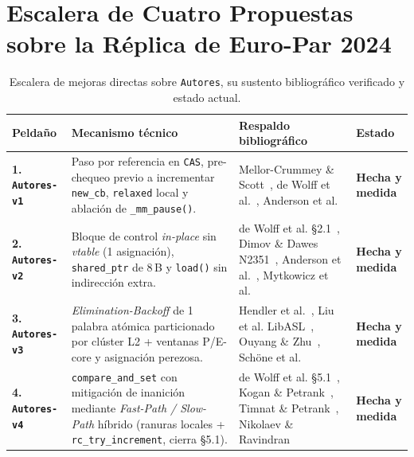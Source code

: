 \documentclass[11pt,a4paper]{article}
\begin{document}
\section{Escalera de Cuatro Propuestas sobre la Réplica de Euro-Par 2024}

\begin{table}[H]
\centering
\caption{Escalera de mejoras directas sobre \texttt{Autores}, su sustento bibliográfico verificado y estado actual.}
\label{tab:escalera}
\footnotesize
\begin{tabularx}{\linewidth}{@{}l >{\raggedright\arraybackslash}X >{\raggedright\arraybackslash}p{4.3cm} l@{}}
\toprule
\textbf{Peldaño} & \textbf{Mecanismo técnico} & \textbf{Respaldo bibliográfico} & \textbf{Estado} \\
\midrule
\textbf{1. \texttt{Autores-v1}} & Paso por referencia en \texttt{CAS}, pre-chequeo previo a incrementar \texttt{new\_cb}, \texttt{relaxed} local y ablación de \texttt{\_mm\_pause()}. & Mellor-Crummey \& Scott~\cite{mellorcrummey1991mcs}, de Wolff et al.~\cite{dewolff2024waitfree}, Anderson et al.~\cite{anderson2022turning} & \textcolor{ok}{\textbf{Hecha y medida}} \\
\textbf{2. \texttt{Autores-v2}} & Bloque de control \emph{in-place} sin \emph{vtable} (1 asignación), \texttt{shared\_ptr} de 8\,B y \texttt{load()} sin indirección extra. & de Wolff et al. \S 2.1~\cite{dewolff2024waitfree}, Dimov \& Dawes N2351~\cite{dimov2007n2351}, Anderson et al.~\cite{anderson2022turning}, Mytkowicz et al.~\cite{mytkowicz2009wrongdata} & \textcolor{ok}{\textbf{Hecha y medida}} \\
\textbf{3. \texttt{Autores-v3}} & \emph{Elimination-Backoff} de 1 palabra atómica particionado por clúster L2 + ventanas P/E-core y asignación perezosa. & Hendler et al.~\cite{hendler2004elimination}, Liu et al. LibASL~\cite{liu2022libasl}, Ouyang \& Zhu~\cite{ouyang2022coreaware}, Schöne et al.~\cite{schone2024alderlake} & \textcolor{ok}{\textbf{Hecha y medida}} \\
\textbf{4. \texttt{Autores-v4}} & \texttt{compare\_and\_set} con mitigación de inanición mediante \emph{Fast-Path / Slow-Path} híbrido (ranuras locales + \texttt{rc\_try\_increment}, cierra \S 5.1). & de Wolff et al. \S 5.1~\cite{dewolff2024waitfree}, Kogan \& Petrank~\cite{kogan2012methodology}, Timnat \& Petrank~\cite{timnat2014simulation}, Nikolaev \& Ravindran~\cite{nikolaev2024crystalline} & \textcolor{ok}{\textbf{Hecha y medida}} \\
\bottomrule
\end{tabularx}
\end{table}
\end{document}
